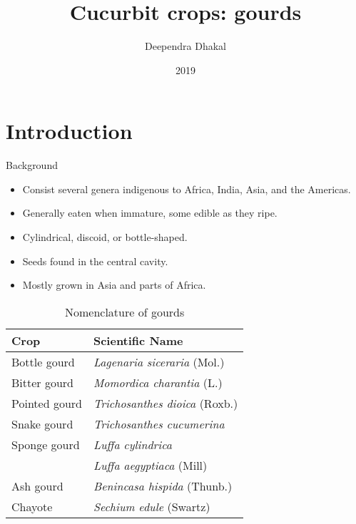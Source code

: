 \documentclass[
  ignorenonframetext,
  aspectratio=169]{beamer}
\title{Cucurbit crops: gourds}
\author{Deependra Dhakal}
\date{2019}
\providecommand{\tightlist}{%
  \setlength{\itemsep}{0pt}\setlength{\parskip}{0pt}}
\begin{document}
\frame{\titlepage}

\begin{frame}[allowframebreaks]
  \tableofcontents[hideallsubsections]
\end{frame}
\hypertarget{introduction}{%
\section{Introduction}\label{introduction}}

\begin{frame}{Background}
\protect\hypertarget{background}{}
\begin{itemize}
\tightlist
\item
  Consist several genera indigenous to Africa, India, Asia, and the
  Americas.
\item
  Generally eaten when immature, some edible as they ripe.
\item
  Cylindrical, discoid, or bottle-shaped.
\item
  Seeds found in the central cavity.
\item
  Mostly grown in Asia and parts of Africa.
\end{itemize}
\end{frame}

\begin{frame}{}
\protect\hypertarget{section}{}
\begin{table}

\caption{\label{tab:gourds-intro}Nomenclature of gourds}
\centering
\begin{tabular}[t]{ll}
\toprule
Crop & Scientific Name\\
\midrule
Bottle gourd & \textit{Lagenaria siceraria} (Mol.)\\
Bitter gourd & \textit{Momordica charantia} (L.)\\
Pointed gourd & \textit{Trichosanthes dioica} (Roxb.)\\
Snake gourd & \textit{Trichosanthes cucumerina}\\
Sponge gourd & \textit{Luffa cylindrica}\\
\addlinespace
 & \textit{Luffa aegyptiaca} (Mill)\\
Ash gourd & \textit{Benincasa hispida} (Thunb.)\\
Chayote & \textit{Sechium edule} (Swartz)\\
\bottomrule
\end{tabular}
\end{table}
\end{frame}
\end{document}
